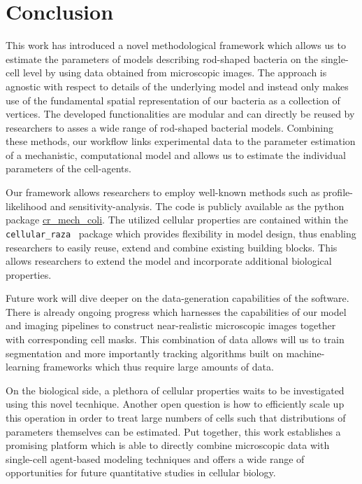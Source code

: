 \section{Conclusion}

This work has introduced a novel methodological framework which allows us to estimate
the parameters
of models describing rod-shaped bacteria on the single-cell level by using data obtained from
microscopic images.
The approach is agnostic with respect to details of the underlying model and instead
only makes use
of the fundamental spatial representation of our bacteria as a collection of vertices.
The developed functionalities are modular and can directly be reused by researchers
to asses a wide
range of rod-shaped bacterial models.
Combining these methods, our workflow links experimental data to the parameter estimation of a
mechanistic, computational model and allows us to estimate the individual parameters of the
cell-agents.

Our framework allows researchers to employ well-known methods such as profile-likelihood and
sensitivity-analysis.
The code is publicly available as the python package
\href{https://github.com/jonaspleyer/cr_mech_coli}{cr\_mech\_coli}.
The utilized cellular properties are contained within the
\texttt{cellular\_raza}~\cite{Pleyer2025}
package which provides flexibility in model design, thus enabling researchers to easily reuse,
extend and combine existing building blocks.
This allows researchers to extend the model and incorporate additional biological properties.

Future work will dive deeper on the data-generation capabilities of the software.
There is already ongoing progress which harnesses the capabilities of our model and
imaging pipelines
to construct near-realistic microscopic images together with corresponding cell masks.
This combination of data allows will us to train segmentation and more importantly
tracking algorithms
built on machine-learning frameworks which thus require large amounts of data.

On the biological side, a plethora of cellular properties waits to be investigated
using this novel
tecnhique.
Another open question is how to efficiently scale up this operation in order to treat
large numbers
of cells such that distributions of parameters themselves can be estimated.
Put together, this work establishes a promising platform which is able to directly combine
microscopic data with single-cell agent-based modeling techniques and offers a wide range of
opportunities for future quantitative studies in cellular biology.

